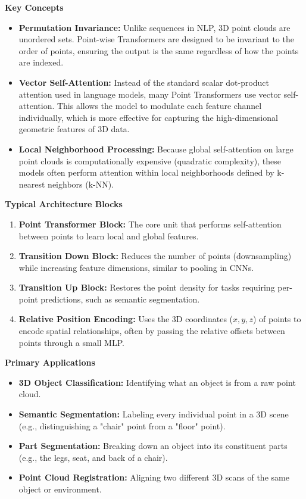 \documentclass{book}
\providecommand{\ProjectDeepHeading}[2]{%
    \par\medskip\noindent\textbf{#2}\par\smallskip
}
\begin{document}
    \ProjectDeepHeading{10}{Key Concepts}
        \begin{itemize}
            \item \textbf{Permutation Invariance:} Unlike sequences in NLP, 3D point clouds are unordered sets. Point-wise Transformers are designed to be invariant to the order of points, ensuring the output is the same regardless of how the points are indexed.
            \item \textbf{Vector Self-Attention:} Instead of the standard scalar dot-product attention used in language models, many Point Transformers use vector self-attention. This allows the model to modulate each feature channel individually, which is more effective for capturing the high-dimensional geometric features of 3D data.
            \item \textbf{Local Neighborhood Processing:} Because global self-attention on large point clouds is computationally expensive (quadratic complexity), these models often perform attention within local neighborhoods defined by k-nearest neighbors (k-NN).
        \end{itemize}
    
    \ProjectDeepHeading{10}{Typical Architecture Blocks}
        \begin{enumerate}
            \item \textbf{Point Transformer Block:} The core unit that performs self-attention between points to learn local and global features.
            \item \textbf{Transition Down Block:} Reduces the number of points (downsampling) while increasing feature dimensions, similar to pooling in CNNs.
            \item \textbf{Transition Up Block:} Restores the point density for tasks requiring per-point predictions, such as semantic segmentation.
            \item \textbf{Relative Position Encoding:} Uses the 3D coordinates ($x, y, z$) of points to encode spatial relationships, often by passing the relative offsets between points through a small MLP.
        \end{enumerate}
    
    \ProjectDeepHeading{10}{Primary Applications}
        \begin{itemize}
            \item \textbf{3D Object Classification:} Identifying what an object is from a raw point cloud.
            \item \textbf{Semantic Segmentation:} Labeling every individual point in a 3D scene (e.g., distinguishing a "chair" point from a "floor" point).
            \item \textbf{Part Segmentation:} Breaking down an object into its constituent parts (e.g., the legs, seat, and back of a chair).
            \item \textbf{Point Cloud Registration:} Aligning two different 3D scans of the same object or environment.
        \end{itemize}
    
\end{document}
